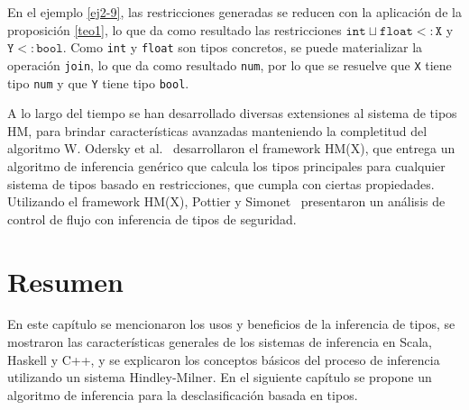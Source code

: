 En el ejemplo \ref{ej2-9}, las restricciones generadas se reducen con la aplicación de la proposición \ref{teo1}, lo que da como resultado las restricciones $\mathtt{int\sqcup float <: X}$ y $\mathtt{Y <: bool}$. Como \texttt{int} y \texttt{float} son tipos concretos, se puede materializar la operación \texttt{join}, lo que da como resultado \texttt{num}, por lo que se resuelve que \texttt{X} tiene tipo \texttt{num} y que \texttt{Y} tiene tipo \texttt{bool}.

A lo largo del tiempo se han desarrollado diversas extensiones al sistema de tipos HM, para brindar características avanzadas manteniendo la completitud del algoritmo W. Odersky et al.~\cite{odersky} desarrollaron el framework HM(X), que entrega un algoritmo de inferencia genérico que calcula los tipos principales para cualquier sistema de tipos basado en restricciones, que cumpla con ciertas propiedades. Utilizando el framework HM(X), Pottier y Simonet~\cite{Pottier} presentaron un análisis de control de flujo con inferencia de tipos de seguridad.
\clearpage
\section*{Resumen}

En este capítulo se mencionaron los usos y beneficios de la inferencia de tipos, se mostraron las características generales de los sistemas de inferencia en Scala, Haskell y C++, y se explicaron los conceptos básicos del proceso de inferencia utilizando un sistema Hindley-Milner. En el siguiente capítulo se propone un algoritmo de inferencia para la desclasificación basada en tipos.

